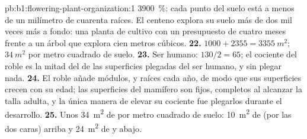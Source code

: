 \begin{solution}{pb:b1:flowering-plant-organization:1}
\qty{3900}{\%}: cada punto del suelo está a menos de un milímetro de
cuarenta raíces. El centeno explora su suelo más de dos mil veces más a
fondo: una planta de cultivo con un presupuesto de cuatro meses frente a un
árbol que explora cien metros cúbicos.
\textbf{22.} $1000 + 2355 = \qty{3355}{m^2}$; $\qty{34}{m^2}$ por metro
cuadrado de suelo.
\textbf{23.} Ser humano: $130/2 = 65$; el cociente del roble es la mitad
del de las superficies plegadas del ser humano, y sin plegar nada.
\textbf{24.} El roble añade módulos,  y raíces cada año, de modo que
sus superficies crecen con su edad; las superficies del mamífero son 
fijos, completos al alcanzar la talla adulta, y la única manera de elevar su
cociente fue plegarlos durante el desarrollo.
\textbf{25.} Unos \qty{34}{m^2} de  por metro
cuadrado de suelo: \qty{10}{m^2} de  (por las dos caras) arriba y
\qty{24}{m^2} de  y  abajo.
\end{solution}
